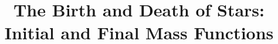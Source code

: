 \documentclass[11pt]{article}
\begin{document}



%



%
%

\title{The Birth and Death of Stars: Initial and Final Mass Functions}


%

\end{document}
